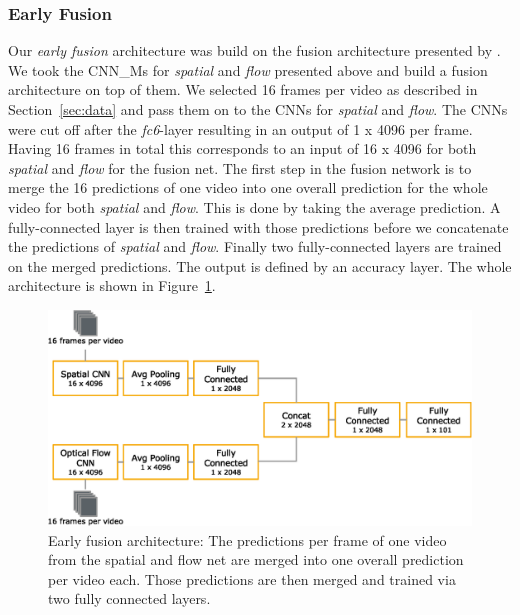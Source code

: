 \subsubsection{Early Fusion}
Our \emph{early fusion} architecture was build on the fusion architecture presented by .
We took the CNN\_Ms for \emph{spatial} and \emph{flow} presented above and build a fusion architecture on top of them.
We selected 16 frames per video as described in Section~\ref{sec:data} and pass them on to the CNNs for \emph{spatial} and \emph{flow}.
The CNNs were cut off after the \textit{fc6}-layer resulting in an output of 1 x 4096 per frame.
Having 16 frames in total this corresponds to an input of 16 x 4096 for both \emph{spatial} and \emph{flow} for the fusion net.
The first step in the fusion network is to merge the 16 predictions of one video into one overall prediction for the whole video for both \emph{spatial} and \emph{flow}.
This is done by taking the average prediction.
A fully-connected layer is then trained with those predictions before we concatenate the predictions of \emph{spatial} and \emph{flow}.
Finally two fully-connected layers are trained on the merged predictions.
The output is defined by an accuracy layer.
The whole architecture is shown in Figure~\ref{fig:early_fusion}.

\begin{figure}[!htb]
	\centering
	\includegraphics[scale=.7]{images/early_fusion.eps}
	\caption{Early fusion architecture: The predictions per frame of one video from the spatial and flow net are merged into one overall prediction per video each. Those predictions are then merged and trained via two fully connected layers.}
	\label{fig:early_fusion}
\end{figure}


